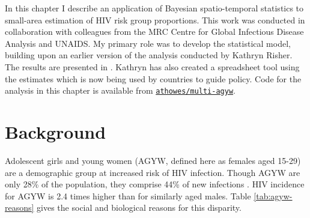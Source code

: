 \documentclass[a4paper, nobind]{templates/ociamthesis}
\begin{document}
\adjustmtc
{}

In this chapter I describe an application of Bayesian spatio-temporal statistics to small-area estimation of HIV risk group proportions.
This work was conducted in collaboration with colleagues from the MRC Centre for Global Infectious Disease Analysis and UNAIDS.
My primary role was to develop the statistical model, building upon an earlier version of the analysis conducted by Kathryn Risher.
The results are presented in \textcite{howes2023spatio}.
Kathryn has also created a spreadsheet tool using the estimates which is now being used by countries to guide policy.
Code for the analysis in this chapter is available from \href{https://github.com/athowes/multi-agyw}{\texttt{athowes/multi-agyw}}.

\hypertarget{background-2}{%
\section{Background}\label{background-2}}

Adolescent girls and young women (AGYW, defined here as females aged 15-29) are a demographic group at increased risk of HIV infection.
Though AGYW are only 28\% of the population, they comprise 44\% of new infections \autocite{unaids2021update}.
HIV incidence for AGYW is 2.4 times higher than for similarly aged males.
Table \ref{tab:agyw-reasons} gives the social and biological reasons for this disparity.
\end{document}
